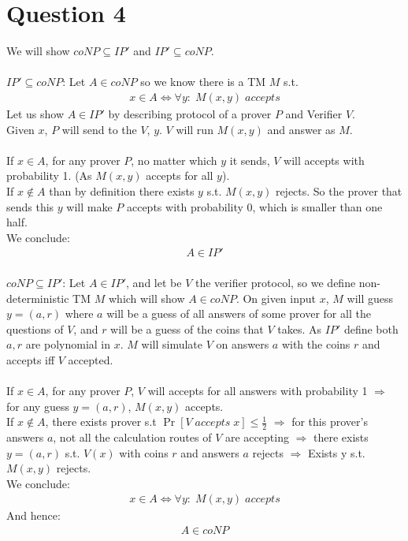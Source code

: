 \documentclass[11pt]{article}
\theoremstyle{plain}
\theoremstyle{nonumberplainnobrackets}
\begin{document}
\section*{Question 4}
We will show  $coNP\subseteq IP'$ and $IP'\subseteq coNP$.\\ \\
\underline{$IP'\subseteq coNP$}: Let $A\in coNP$ so we know there is a TM $M$ s.t.
\begin{align*}
x\in A \iff \forall y :\;M(x,y)\; accepts
\end{align*}
Let us show $A\in IP'$ by describing protocol of a prover $P$ and Verifier $V$. \\
Given $x$, $P$ will send to the $V$, $y$. $V$ will run $M(x,y)$ and answer as $M$.\\
\\
If $x\in A$, for any prover $P$, no matter which $y$ it sends, $V$ will accepts with probability 1. (As $M(x,y)$ accepts for all $y$). \\
If $x\notin A$ than by definition there exists $y$ s.t. $M(x,y)$ rejects. So the prover that sends this $y$ will make $P$ accepts with probability 0, which is smaller than one half.  \\
We conclude:
\begin{align*}
A\in IP'
\end{align*}
\\
\underline{$coNP\subseteq IP'$}: Let $A\in IP'$, and let be $V$ the verifier protocol, so we define non-deterministic TM $M$ which will show $A\in coNP$. On given input $x$, $M$ will guess $y=(a,r)$ where $a$ will be a guess of all answers of some prover for all the questions of $V$, and $r$ will be a guess of the coins that $V$ takes. As $IP'$ define both $a,r$ are polynomial in $x$. $M$ will simulate $V$ on answers $a$ with the coins $r$ and accepts iff $V$ accepted.
\\
\\
If $x\in A$, for any prover $P$, $V$ will accepts for all answers with probability 1 $\Rightarrow$ for any guess $y=(a,r)$, $M(x,y)$ accepts.\\
If $x\notin A$, there exists prover s.t $\Pr[V\;accepts \;x]\le \frac{1}{2}$ $\Rightarrow$ for this prover's answers $a$, not all the calculation routes of $V$ are accepting $\Rightarrow$ there exists $y=(a,r)$ s.t. $V(x)$ with coins $r$ and answers $a$ rejects $\Rightarrow$ Exists y s.t. $M(x,y)$ rejects.\\
We conclude:
\begin{align*}
x\in A\iff \forall y:\; M(x,y) \; accepts
\end{align*}
And hence:
\begin{align*}
A\in coNP
\end{align*}
\end{document}
